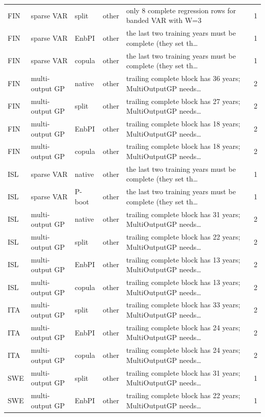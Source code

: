 {\begin{longtable}{@{}lllp{1.6cm}p{6.2cm}r@{}}
FIN & sparse VAR & split & other & only 8 complete regression rows for banded VAR with W=3 & 1 \\
FIN & sparse VAR & EnbPI & other & the last two training years must be complete (they set th\ldots & 1 \\
FIN & sparse VAR & copula & other & the last two training years must be complete (they set th\ldots & 1 \\
FIN & multi-output GP & native & other & trailing complete block has 36 years; MultiOutputGP needs\ldots & 2 \\
FIN & multi-output GP & split & other & trailing complete block has 27 years; MultiOutputGP needs\ldots & 2 \\
FIN & multi-output GP & EnbPI & other & trailing complete block has 18 years; MultiOutputGP needs\ldots & 2 \\
FIN & multi-output GP & copula & other & trailing complete block has 18 years; MultiOutputGP needs\ldots & 2 \\
ISL & sparse VAR & native & other & the last two training years must be complete (they set th\ldots & 1 \\
ISL & sparse VAR & P-boot & other & the last two training years must be complete (they set th\ldots & 1 \\
ISL & multi-output GP & native & other & trailing complete block has 31 years; MultiOutputGP needs\ldots & 2 \\
ISL & multi-output GP & split & other & trailing complete block has 22 years; MultiOutputGP needs\ldots & 2 \\
ISL & multi-output GP & EnbPI & other & trailing complete block has 13 years; MultiOutputGP needs\ldots & 2 \\
ISL & multi-output GP & copula & other & trailing complete block has 13 years; MultiOutputGP needs\ldots & 2 \\
ITA & multi-output GP & split & other & trailing complete block has 33 years; MultiOutputGP needs\ldots & 2 \\
ITA & multi-output GP & EnbPI & other & trailing complete block has 24 years; MultiOutputGP needs\ldots & 2 \\
ITA & multi-output GP & copula & other & trailing complete block has 24 years; MultiOutputGP needs\ldots & 2 \\
SWE & multi-output GP & split & other & trailing complete block has 31 years; MultiOutputGP needs\ldots & 1 \\
SWE & multi-output GP & EnbPI & other & trailing complete block has 22 years; MultiOutputGP needs\ldots & 1 \\

\end{longtable}}
